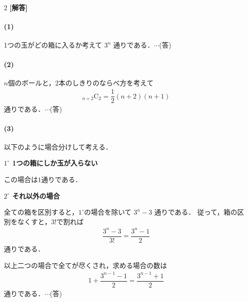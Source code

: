 \documentclass[../../main.tex]{subfiles}
\begin{document}
\setcounter{equation}{0}
\begin{oframed}
  
\end{oframed}
\setlength{\columnseprule}{0.4pt}
\begin{multicols}{2}
  {\bf [解答]}

  \paragraph{(1)}
  1つの玉がどの箱に入るか考えて $3^n$ 通りである．$\cdots$(答)

  \paragraph{(2)}
  $n$個のボールと，$2$本のしきりのならべ方を考えて
  \begin{align}
    {}_{n+2}\mathrm{C}_2 = \dfrac{1}{2}(n+2)(n+1)
  \end{align}
  通りである．$\cdots$(答)

  \paragraph{(3)}
  以下のように場合分けして考える．

  \textbf{$1^\circ$ 1つの箱にしか玉が入らない}

  この場合は$1$通りである．

  \textbf{$2^\circ$ それ以外の場合}

  全ての箱を区別すると，$1^{\circ}$の場合を除いて $3^n-3$ 通りである．
  従って，箱の区別をなくすと，$3!$で割れば
  \begin{align}
    \dfrac{3^n-3}{3!} = \dfrac{3^n-1}{2}
  \end{align}
  通りである．

  以上二つの場合で全てが尽くされ，求める場合の数は
  \begin{align}
    1 + \dfrac{3^{n-1}-1}{2} = \dfrac{3^{n-1}+1}{2}
  \end{align}
  通りである．$\cdots$(答)


\end{multicols}
\end{document}
